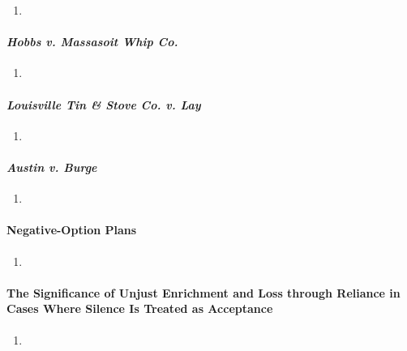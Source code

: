 \begin{enumerate}
    \item %
\end{enumerate}

\paragraph{\emph{Hobbs v. Massasoit Whip Co.}}

\begin{enumerate}
    \item %
\end{enumerate}

\paragraph{\emph{Louisville Tin \& Stove Co. v. Lay}}

\begin{enumerate}
    \item %
\end{enumerate}

\paragraph{\emph{Austin v. Burge}}

\begin{enumerate}
    \item %
\end{enumerate}

\paragraph{Negative-Option Plans}

\begin{enumerate}
    \item %
\end{enumerate}

\paragraph{The Significance of Unjust Enrichment and Loss through Reliance in 
Cases Where Silence Is Treated as Acceptance}

\begin{enumerate}
    \item %
\end{enumerate}

